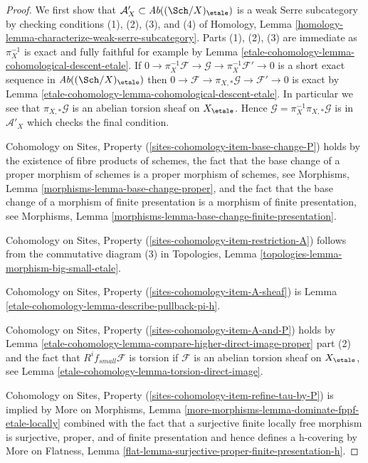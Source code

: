 \begin{proof}
We first show that $\mathcal{A}'_X \subset \textit{Ab}((\Sch/X)_\etale)$
is a weak Serre subcategory by checking conditions (1), (2), (3), and (4)
of Homology, Lemma \ref{homology-lemma-characterize-weak-serre-subcategory}.
Parts (1), (2), (3) are immediate as $\pi_X^{-1}$ is exact and
fully faithful for example by Lemma \ref{etale-cohomology-lemma-cohomological-descent-etale}. If
$0 \to \pi_X^{-1}\mathcal{F} \to \mathcal{G} \to \pi_X^{-1}\mathcal{F}' \to 0$
is a short exact sequence in $\textit{Ab}((\Sch/X)_\etale)$
then $0 \to \mathcal{F} \to \pi_{X, *}\mathcal{G} \to \mathcal{F}' \to 0$
is exact by Lemma \ref{etale-cohomology-lemma-cohomological-descent-etale}.
In particular we see that $\pi_{X, *}\mathcal{G}$ is an abelian
torsion sheaf on $X_\etale$.
Hence $\mathcal{G} = \pi_X^{-1}\pi_{X, *}\mathcal{G}$ is in
$\mathcal{A}'_X$ which checks the final condition.

\medskip\noindent
Cohomology on Sites, Property (\ref{sites-cohomology-item-base-change-P}) holds
by the existence of fibre products of schemes,
the fact that the base change of a proper morphism of
schemes is a proper morphism of schemes, see
Morphisms, Lemma \ref{morphisms-lemma-base-change-proper}, and
the fact that the base change of a morphism of finite presentation
is a morphism of finite presentation, see
Morphisms, Lemma \ref{morphisms-lemma-base-change-finite-presentation}.

\medskip\noindent
Cohomology on Sites, Property (\ref{sites-cohomology-item-restriction-A})
follows from the commutative diagram (3) in
Topologies, Lemma \ref{topologies-lemma-morphism-big-small-etale}.

\medskip\noindent
Cohomology on Sites, Property (\ref{sites-cohomology-item-A-sheaf}) is
Lemma \ref{etale-cohomology-lemma-describe-pullback-pi-h}.

\medskip\noindent
Cohomology on Sites, Property (\ref{sites-cohomology-item-A-and-P}) holds by
Lemma \ref{etale-cohomology-lemma-compare-higher-direct-image-proper} part (2)
and the fact that $R^if_{small}\mathcal{F}$
is torsion if $\mathcal{F}$ is an abelian torsion
sheaf on $X_\etale$, see Lemma \ref{etale-cohomology-lemma-torsion-direct-image}.

\medskip\noindent
Cohomology on Sites, Property (\ref{sites-cohomology-item-refine-tau-by-P})
is implied by More on Morphisms, Lemma
\ref{more-morphisms-lemma-dominate-fppf-etale-locally}
combined with the fact that a surjective finite locally free morphism
is surjective, proper, and of finite presentation and hence
defines a h-covering by More on Flatness, Lemma
\ref{flat-lemma-surjective-proper-finite-presentation-h}.
\end{proof}

